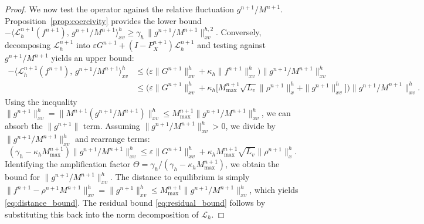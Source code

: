 \documentclass[10pt,a4paper]{amsart}
\begin{document}
\begin{proof}
We now test the operator against the relative fluctuation $g^{n+1}/M^{n+1}$. Proposition~\ref{prop:coercivity} provides the lower bound $-\langle \mathcal L_{h}^{n+1}(f^{n+1}),\,g^{n+1}/M^{n+1} \rangle_{xv}^h \ge \gamma_h\,\|g^{n+1}/M^{n+1}\|_{xv}^{h,2}$. Conversely, decomposing $\mathcal L_{h}^{n+1}$ into $\varepsilon G^{n+1} + (I-P_X^{n+1})\mathcal L_{h}^{n+1}$ and testing against $g^{n+1}/M^{n+1}$ yields an upper bound:
\begin{align*}
  -\big\langle \mathcal L_{h}^{n+1}(f^{n+1}),\,g^{n+1}/M^{n+1} \big\rangle_{xv}^h
  &\le \big( \varepsilon \|G^{n+1}\|_{xv}^h + \kappa_h \|f^{n+1}\|_{xv}^h \big) \|g^{n+1}/M^{n+1}\|_{xv}^h \\
  &\le \Big( \varepsilon \|G^{n+1}\|_{xv}^h + \kappa_h \big[ M_{\max}^{n+1}\sqrt{L_v}\|\rho^{n+1}\|_x^h + \|g^{n+1}\|_{xv}^h \big] \Big) \|g^{n+1}/M^{n+1}\|_{xv}^h.
\end{align*}
Using the inequality $\|g^{n+1}\|_{xv}^h = \|M^{n+1} (g^{n+1}/M^{n+1})\|_{xv}^h \le M_{\max}^{n+1} \|g^{n+1}/M^{n+1}\|_{xv}^h$, we can absorb the $\|g^{n+1}\|$ term. Assuming $\|g^{n+1}/M^{n+1}\|_{xv}^h > 0$, we divide by $\|g^{n+1}/M^{n+1}\|_{xv}^h$ and rearrange terms:
\[
  (\gamma_h - \kappa_h M_{\max}^{n+1}) \|g^{n+1}/M^{n+1}\|_{xv}^h \le \varepsilon \|G^{n+1}\|_{xv}^h + \kappa_h M_{\max}^{n+1} \sqrt{L_v} \|\rho^{n+1}\|_x^h.
\]
Identifying the amplification factor $\Theta = \gamma_h / (\gamma_h - \kappa_h M_{\max}^{n+1})$, we obtain the bound for $\|g^{n+1}/M^{n+1}\|_{xv}^h$. The distance to equilibrium is simply $\|f^{n+1}-\rho^{n+1}M^{n+1}\|_{xv}^h = \|g^{n+1}\|_{xv}^h \le M_{\max}^{n+1}\|g^{n+1}/M^{n+1}\|_{xv}^h$, which yields \eqref{eq:distance_bound}. The residual bound \eqref{eq:residual_bound} follows by substituting this back into the norm decomposition of $\mathcal{L}_{h}$.
\end{proof}
\end{document}
